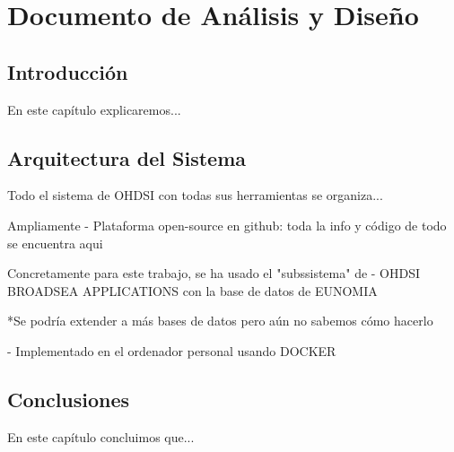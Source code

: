 \chapter{Documento de Análisis y Diseño}\label{cap:diseño}

\section{Introducción}
En este capítulo explicaremos...

\section{Arquitectura del Sistema}

Todo el sistema de OHDSI con todas sus herramientas se organiza...

Ampliamente
- Plataforma open-source en github: toda la info y código de todo se encuentra aqui


Concretamente para este trabajo,
se ha usado el "subssistema" de
- OHDSI BROADSEA APPLICATIONS con la base de datos de EUNOMIA

*Se podría extender a más bases de datos pero aún no sabemos cómo hacerlo

- Implementado en el ordenador personal usando DOCKER










\section{Conclusiones}
En este capítulo concluimos que...